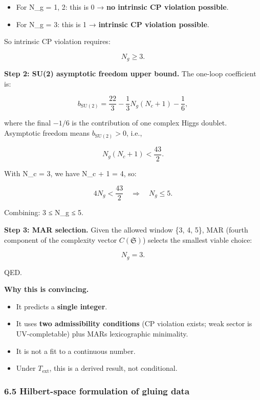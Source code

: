 \begin{itemize}
\tightlist
\item
  For N\_g = 1, 2: this is 0 → \textbf{no intrinsic CP violation possible}.
\item
  For N\_g = 3: this is 1 → \textbf{intrinsic CP violation possible}.
\end{itemize}

So intrinsic CP violation requires:

\[
N_g \ge 3.
\]

\textbf{Step 2: SU(2) asymptotic freedom upper bound.} The one-loop coefficient is:

\[
b_{\mathrm{SU}(2)} = \frac{22}{3} - \frac{1}{3}N_g(N_c + 1) - \frac{1}{6},
\]

where the final \(-1/6\) is the contribution of one complex Higgs doublet. Asymptotic freedom means \(b_{\mathrm{SU}(2)} > 0\), i.e.,

\[
N_g(N_c + 1) < \frac{43}{2}.
\]

With N\_c = 3, we have N\_c + 1 = 4, so:

\[
4 N_g < \frac{43}{2} \quad \Rightarrow \quad N_g \le 5.
\]

Combining: 3 ≤ N\_g ≤ 5.

\textbf{Step 3: MAR selection.} Given the allowed window \{3, 4, 5\}, MAR (fourth component of the complexity vector \(C(\mathfrak S)\)) selects the smallest viable choice:

\[
N_g = 3.
\]

QED.

\textbf{Why this is convincing.}

\begin{itemize}
\tightlist
\item
  It predicts a \textbf{single integer}.
\item
  It uses \textbf{two admissibility conditions} (CP violation exists; weak sector is UV-completable) plus MAR\textquotesingle s lexicographic minimality.
\item
  It is not a fit to a continuous number.
\item
  Under \(T_{\mathrm{ext}}\), this is a derived result, not conditional.
\end{itemize}

\subsubsection{6.5 Hilbert-space formulation of gluing data}\label{65-hilbert-space-formulation-of-gluing-data}

